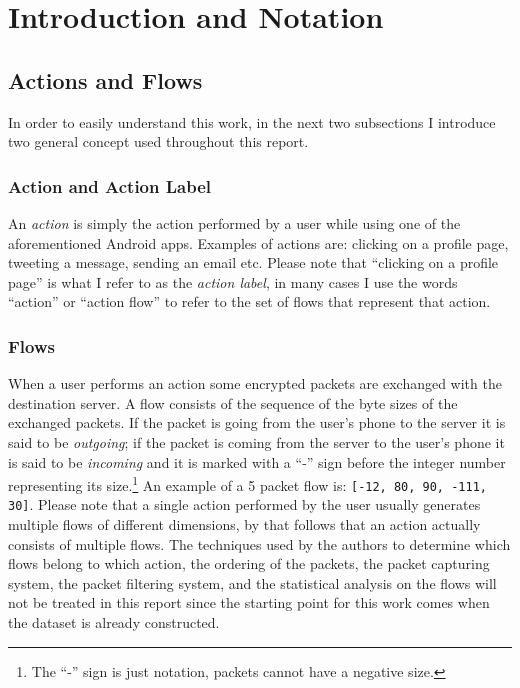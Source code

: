 \section{Introduction and Notation}
\label{sec:intro}

\subsection{Actions and Flows}
\label{subsec:flows}
In order to easily understand this work, in the next two subsections I introduce two general concept used throughout this report.

\subsubsection{Action and Action Label}
An \textit{action} is simply the action performed by a user while using one of the aforementioned Android apps. Examples of actions are: clicking on a profile page, tweeting a message, sending an email etc. Please note that ``clicking on a profile page'' is what I refer to as the \textit{action label}, in many cases I use the words ``action'' or ``action flow'' to refer to the set of flows that represent that action. 

\subsubsection{Flows}
When a user performs an action some encrypted packets are exchanged with the destination server. A flow consists of the sequence of the byte sizes of the exchanged packets. If the packet is going from the user's phone to the server it is said to be \textit{outgoing}; if the packet is coming from the server to the user's phone it is said to be \textit{incoming} and it is marked with a ``-'' sign before the integer number representing its size.\footnote{The ``-'' sign is just notation, packets cannot have a negative size.} An example of a 5 packet flow is: \texttt{[-12, 80, 90, -111, 30]}. Please note that a single action performed by the user usually generates multiple flows of different dimensions, by that follows that an action actually consists of multiple flows. The techniques used by the authors to determine which flows belong to which action, the ordering of the packets, the packet capturing system, the packet filtering system, and the statistical analysis on the flows will not be treated in this report since the starting point for this work comes when the dataset is already constructed.

